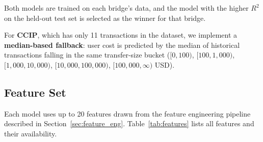 Both models are trained on each bridge's data, and the model with the higher $R^2$ on the held-out test set is selected as the winner for that bridge.

For \textbf{CCIP}, which has only 11 transactions in the dataset, we implement a \textbf{median-based fallback}: user cost is predicted by the median of historical transactions falling in the same transfer-size bucket ($[0, 100)$, $[100, 1{,}000)$, $[1{,}000, 10{,}000)$, $[10{,}000, 100{,}000)$, $[100{,}000, \infty)$ USD).

\subsection{Feature Set}

Each model uses up to 20 features drawn from the feature engineering pipeline described in Section~\ref{sec:feature_eng}. Table~\ref{tab:features} lists all features and their availability.

